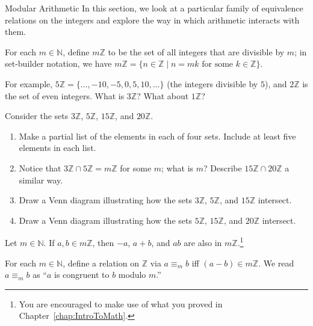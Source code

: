 
\begin{section}{Modular Arithmetic}
In this section, we look at a particular family of equivalence relations on the integers and explore the way in which arithmetic interacts with them.

\begin{definition}
For each $m\in \mathbb{N}$, define $m\mathbb{Z}$ to be the set of all integers that are divisible by $m$; in set-builder notation, we have   $m\mathbb{Z} = \{n \in \mathbb{Z}  \mid n = mk \text{ for some } k \in \mathbb{Z}\}.$

\end{definition}

For example, $5 \mathbb{Z} = \{ \ldots,-10,-5,0,5,10,\ldots\}$ (the integers divisible by $5$), and $2\mathbb{Z}$ is the set of even integers. What is $3\mathbb{Z}$? What about $1\mathbb{Z}$?

\begin{exercise} 
Consider the sets $3 \mathbb{Z}$, $5 \mathbb{Z}$, $15 \mathbb{Z}$, and $20 \mathbb{Z}$.
\begin{enumerate}[label=\textrm{(\alph*)}]
\item Make a partial list of the elements in each of four sets. Include at least five elements in each list.
\item Notice that $3 \mathbb{Z} \cap5 \mathbb{Z} = m\mathbb{Z}$ for some $m$; what is $m$? Describe $15 \mathbb{Z}\cap 20 \mathbb{Z}$ a similar way.
\item Draw a Venn diagram illustrating how the sets $3 \mathbb{Z}$, $5 \mathbb{Z}$, and $15 \mathbb{Z}$ intersect.  
\item Draw a Venn diagram illustrating how the sets $5 \mathbb{Z}$, $15 \mathbb{Z}$, and $20 \mathbb{Z}$ intersect.
\end{enumerate}
\end{exercise}

\begin{theorem}
Let $m\in \mathbb{N}$. If $a,b \in m \mathbb{Z}$, then $-a$, $a+b$, and $ab$ are also in $m \mathbb{Z}$.\footnote{You are encouraged to make use of what you proved in Chapter~\ref{chap:IntroToMath}.}
\end{theorem}

\begin{definition}\label{def:modulo}
For each  $m\in \mathbb{N}$,  define a relation on $\mathbb{Z}$ via $a\equiv_m b$ iff $(a-b) \in m\mathbb{Z}$. We read $a\equiv_m b$ as ``$a$ is congruent to $b$ modulo $m$.''
\end{definition}


\end{section}
